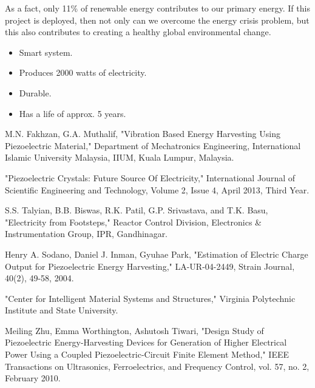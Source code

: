 \documentclass[12pt]{article}
\begin{document}
As a fact, only 11\% of renewable energy contributes to our primary energy. If this project is deployed, then not only can we overcome the energy crisis problem, but this also contributes to creating a healthy global environmental change.

\begin{itemize}[noitemsep]
    \item Smart system.
    \item Produces 2000 watts of electricity.
    \item Durable.
    \item Has a life of approx. 5 years.
\end{itemize}
\newpage
\begin{thebibliography}{99}

M.N. Fakhzan, G.A. Muthalif, "Vibration Based Energy Harvesting Using Piezoelectric Material," Department of Mechatronics Engineering, International Islamic University Malaysia, IIUM, Kuala Lumpur, Malaysia.

"Piezoelectric Crystals: Future Source Of Electricity," International Journal of Scientific Engineering and Technology, Volume 2, Issue 4, April 2013, Third Year.

S.S. Talyian, B.B. Biswas, R.K. Patil, G.P. Srivastava, and T.K. Basu, "Electricity from Footsteps," Reactor Control Division, Electronics & Instrumentation Group, IPR, Gandhinagar.

Henry A. Sodano, Daniel J. Inman, Gyuhae Park, "Estimation of Electric Charge Output for Piezoelectric Energy Harvesting," LA-UR-04-2449, Strain Journal, 40(2), 49-58, 2004.

"Center for Intelligent Material Systems and Structures," Virginia Polytechnic Institute and State University.

Meiling Zhu, Emma Worthington, Ashutosh Tiwari, "Design Study of Piezoelectric Energy-Harvesting Devices for Generation of Higher Electrical Power Using a Coupled Piezoelectric-Circuit Finite Element Method," IEEE Transactions on Ultrasonics, Ferroelectrics, and Frequency Control, vol. 57, no. 2, February 2010.

\end{thebibliography}
\end{document}
